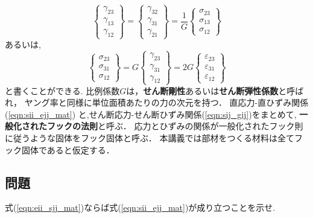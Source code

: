 \documentclass[10pt,a4j]{jbook}
\begin{document}
\begin{equation}
	\left\{ 
		\begin{array}{*{20}{c}}
		\gamma_{23}\\
		\gamma_{13}\\
		\gamma_{12}
		\end{array}
	\right\} 
	=
	\left\{ 
		\begin{array}{*{20}{c}}
		\gamma_{32}\\
		\gamma_{31}\\
		\gamma_{21}
		\end{array}
	\right\} 
	= \frac{1}{G}
	\left\{
		\begin{array}{*{20}{c}}
		\sigma _{23}\\
		\sigma _{13}\\
		\sigma _{12}
		\end{array}
	\right\}
	\label{eqn:gij_sij}
\end{equation}
あるいは,
\begin{equation}
	\left\{ 
		\begin{array}{*{20}{c}}
		\sigma_{23}\\
		\sigma_{31}\\
		\sigma_{12}
		\end{array}
	\right\} 
	=
	G
	\left\{
		\begin{array}{*{20}{c}}
		\gamma_{23}\\
		\gamma_{31}\\
		\gamma_{12}
		\end{array}
	\right\}
	=
	2G
	\left\{
		\begin{array}{*{20}{c}}
		\varepsilon_{23}\\
		\varepsilon_{31}\\
		\varepsilon_{12}
		\end{array}
	\right\}
	\label{eqn:sij_gij}
\end{equation}
と書くことができる.
比例係数$G$は，{\bf せん断剛性}あるいは{\bf せん断弾性係数}と呼ばれ，
ヤング率と同様に単位面積あたりの力の次元を持つ．
直応力-直ひずみ関係(\ref{eqn:sii_ejj_mat})
と,せん断応力-せん断ひずみ関係(\ref{eqn:sij_gij})をまとめて,
{\bf 一般化されたフックの法則}と呼ぶ．
応力とひずみの関係が一般化されたフック則に従うような固体をフック固体と呼ぶ．
本講義では部材をつくる材料は全てフック固体であると仮定する．
\subsection{問題}
式(\ref{eqn:eii_sjj_mat})ならば式(\ref{eqn:sii_ejj_mat})が成り立つことを示せ. 
\end{document}
